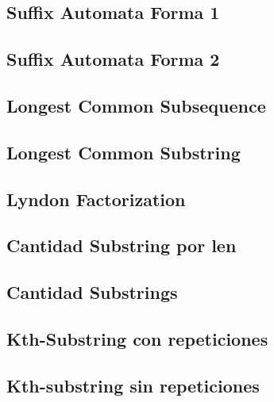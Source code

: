 \subsection{Suffix Automata Forma 1}
\raggedbottom
\hrulefill
\subsection{Suffix Automata Forma 2}
\raggedbottom
\hrulefill
\subsection{Longest Common Subsequence}
\raggedbottom
\hrulefill
\subsection{Longest Common Substring}
\raggedbottom
\hrulefill
\subsection{Lyndon Factorization}
\raggedbottom
\hrulefill
\subsection{Cantidad Substring por len}
\raggedbottom
\hrulefill
\subsection{Cantidad Substrings}
\raggedbottom
\hrulefill
\subsection{Kth-Substring con repeticiones}
\raggedbottom
\hrulefill
\subsection{Kth-substring sin repeticiones}
\raggedbottom
\hrulefill
